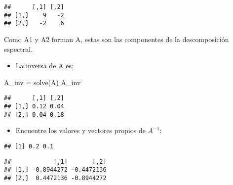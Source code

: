 \documentclass[
]{article}
\newenvironment{Shaded}{\begin{snugshade}}{\end{snugshade}}
\newcommand{\FunctionTok}[1]{\textcolor[rgb]{0.00,0.00,0.00}{#1}}
\newcommand{\NormalTok}[1]{#1}
\newcommand{\OtherTok}[1]{\textcolor[rgb]{0.56,0.35,0.01}{#1}}
\newcommand{\SpecialCharTok}[1]{\textcolor[rgb]{0.00,0.00,0.00}{#1}}
\providecommand{\tightlist}{%
  \setlength{\itemsep}{0pt}\setlength{\parskip}{0pt}}
\begin{document}
\begin{verbatim}
##      [,1] [,2]
## [1,]    9   -2
## [2,]   -2    6
\end{verbatim}

Como A1 y A2 forman A, estas son las componentes de la descomposición
espectral.

\begin{itemize}
\tightlist
\item
  La inversa de A es:
\end{itemize}

\begin{Shaded}
\begin{Highlighting}[]
\NormalTok{A\_inv }\OtherTok{=} \FunctionTok{solve}\NormalTok{(A)}
\NormalTok{A\_inv}
\end{Highlighting}
\end{Shaded}

\begin{verbatim}
##      [,1] [,2]
## [1,] 0.12 0.04
## [2,] 0.04 0.18
\end{verbatim}

\begin{itemize}
\tightlist
\item
  Encuentre los valores y vectores propios de \(A^{-1}\):
\end{itemize}

\begin{Shaded}
\end{Shaded}

\begin{verbatim}
## [1] 0.2 0.1
\end{verbatim}

\begin{Shaded}
\end{Shaded}

\begin{verbatim}
##            [,1]       [,2]
## [1,] -0.8944272 -0.4472136
## [2,]  0.4472136 -0.8944272
\end{verbatim}
\end{document}
